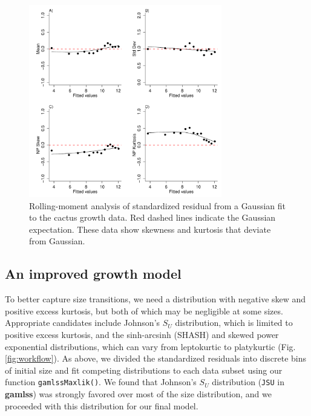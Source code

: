\documentclass[11pt]{article}
\begin{document}
{\begin{figure}
\centering
\includegraphics[width=0.75\textwidth]{figures/cactus_rolling_moments}
\caption{Rolling-moment analysis of standardized residual from a Gaussian fit to the cactus growth data. Red dashed lines indicate the Gaussian expectation. These data show skewness and kurtosis that deviate from Gaussian.}
\label{fig:cactus_rolling_moments}
\end{figure} 

\subsection{An improved growth model}
To better capture size transitions, we need a distribution with negative skew and positive excess kurtosis, but both of which may be negligible at some sizes. 
Appropriate candidates include Johnson's $S_{U}$ distribution, which is limited to positive excess kurtosis, and the sinh-arcsinh (SHASH) and skewed power exponential distributions, which can vary from leptokurtic to platykurtic (Fig. \ref{fig:workflow}). 
As above, we divided the standardized residuals into discrete bins of initial size and fit competing distributions to each data subset using our function \texttt{gamlssMaxlik()}.
We found that Johnson's $S_{U}$ distribution (\texttt{JSU} in \textbf{gamlss}) was strongly favored over most of the size distribution, and we proceeded with this distribution for our final model. 

}
\end{document}
